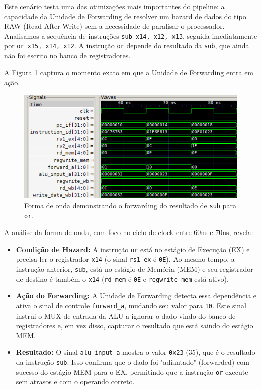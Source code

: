 \documentclass[12pt, a4paper]{article}
\begin{document}
Este cenário testa uma das otimizações mais importantes do pipeline: a capacidade da Unidade de Forwarding de resolver um hazard de dados do tipo RAW (Read-After-Write) sem a necessidade de paralisar o processador. Analisamos a sequência de instruções \texttt{sub x14, x12, x13}, seguida imediatamente por \texttt{or x15, x14, x12}. A instrução \texttt{or} depende do resultado da \texttt{sub}, que ainda não foi escrito no banco de registradores.

A Figura \ref{fig:gtk_fwd} captura o momento exato em que a Unidade de Forwarding entra em ação.

\begin{figure}[H]
    \centering
    \includegraphics[width=1\textwidth]{Cenário2.png}
    \caption{Forma de onda demonstrando o forwarding do resultado de \texttt{sub} para \texttt{or}.}
    \label{fig:gtk_fwd}
\end{figure}

A análise da forma de onda, com foco no ciclo de clock entre 60ns e 70ns, revela:
\begin{itemize}
    \item \textbf{Condição de Hazard:} A instrução \texttt{or} está no estágio de Execução (EX) e precisa ler o registrador \texttt{x14} (o sinal \texttt{rs1\_ex} é \texttt{0E}). Ao mesmo tempo, a instrução anterior, \texttt{sub}, está no estágio de Memória (MEM) e seu registrador de destino é também o \texttt{x14} (\texttt{rd\_mem} é \texttt{0E} e \texttt{regwrite\_mem} está ativo).
    
    \item \textbf{Ação do Forwarding:} A Unidade de Forwarding detecta essa dependência e ativa o sinal de controle \texttt{forward\_a}, mudando seu valor para \texttt{10}. Este sinal instrui o MUX de entrada da ALU a ignorar o dado vindo do banco de registradores e, em vez disso, capturar o resultado que está saindo do estágio MEM.
    
    \item \textbf{Resultado:} O sinal \texttt{alu\_input\_a} mostra o valor \texttt{0x23} (35), que é o resultado da instrução \texttt{sub}. Isso confirma que o dado foi "adiantado" (forwarded) com sucesso do estágio MEM para o EX, permitindo que a instrução \texttt{or} execute sem atrasos e com o operando correto.
\end{itemize}
\end{document}
